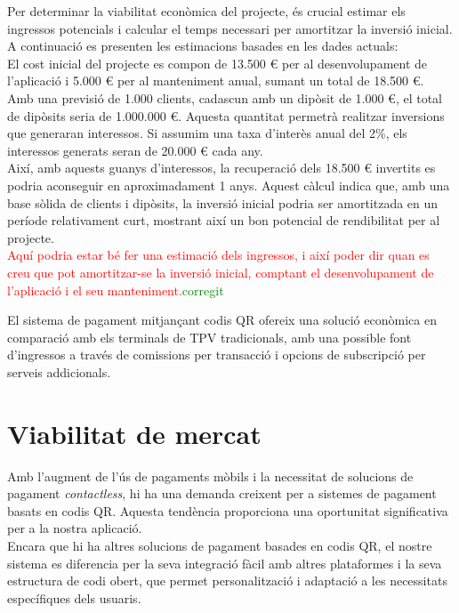 \documentclass[a4paper,12pt,twoside]{ThesisStyle}
\newcommand{\pau}[1]{\textcolor{red}{#1}}
\newcommand{\sudan}[1]{\textcolor{green}{#1}}
\begin{document}
Per determinar la viabilitat econòmica del projecte, és crucial estimar els ingressos potencials i calcular el temps necessari per amortitzar la inversió inicial. A continuació es presenten les estimacions basades en les dades actuals:\\

El cost inicial del projecte es compon de 13.500 € per al desenvolupament de l'aplicació i 5.000 € per al manteniment anual, sumant un total de 18.500 €.\\

Amb una previsió de 1.000 clients, cadascun amb un dipòsit de 1.000 €, el total de dipòsits seria de 1.000.000 €. Aquesta quantitat permetrà realitzar inversions que generaran interessos. Si assumim una taxa d'interès anual del 2\%, els interessos generats seran de 20.000 € cada any.\\

Així, amb aquests guanys d'interessos, la recuperació dels 18.500 € invertits es podria aconseguir en aproximadament 1 anys. Aquest càlcul indica que, amb una base sòlida de clients i dipòsits, la inversió inicial podria ser amortitzada en un període relativament curt, mostrant així un bon potencial de rendibilitat per al projecte.\\

\pau{Aquí podria estar bé fer una estimació dels ingressos, i així poder dir quan es creu que pot amortitzar-se la inversió inicial, comptant el desenvolupament de l'aplicació i el seu manteniment.}\sudan{corregit}

El sistema de pagament mitjançant codis QR ofereix una solució econòmica en comparació amb els terminals de TPV tradicionals, amb una possible font d'ingressos a través de comissions per transacció i opcions de subscripció per serveis addicionals.




\section{Viabilitat de mercat}
\label{subsec:Viabilitat de mercat}

Amb l'augment de l'ús de pagaments mòbils i la necessitat de solucions de pagament \textit{contactless}, hi ha una demanda creixent per a sistemes de pagament basats en codis QR. Aquesta tendència proporciona una oportunitat significativa per a la nostra aplicació.\\

Encara que hi ha altres solucions de pagament basades en codis QR, el nostre sistema es diferencia per la seva integració fàcil amb altres plataformes i la seva estructura de codi obert, que permet personalització i adaptació a les necessitats específiques dels usuaris.
\end{document}
